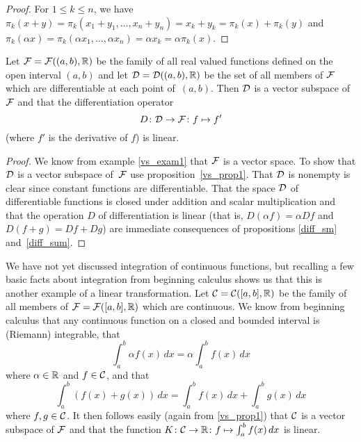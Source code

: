 \begin{proof} For $1 \le k \le n$, we have $\pi_k(x + y) = \pi_k(x_1 + y_1, \dots, x_n + y_n) =
x_k + y_k = \pi_k(x) + \pi_k(y)$ and $\pi_k(\alpha x) = \pi_k(\alpha x_1, \dots, \alpha x_n) =
\alpha x_k = \alpha \pi_k(x)$.
\end{proof}

\begin{exam}\label{lt_exam2}  Let $\mathcal{F} = \mathcal{F}((a,b),\mathbb{R})$ be the family of all real valued
functions defined on the open interval $(a,b)$ and let $\mathcal{D} = \mathcal{D}((a,b),\mathbb{R})$ be the set
of all members of $\mathcal{F}$ which are differentiable at each point of~$(a,b)$.  Then $\mathcal{D}$
is a vector subspace of $\mathcal{F}$ and that the differentiation operator
  \[ D \colon \mathcal{D} \rightarrow \mathcal{F} \colon  f \mapsto f' \]
(where $f'$ is the derivative of $f$) is linear.
\end{exam}

\begin{proof} We know from example \ref{vs_exam1} that $\mathcal{F}$ is a vector space.  To show that
$\mathcal{D}$ is a vector subspace of~$\mathcal{F}$ use proposition~\ref{vs_prop1}.  That $\mathcal{D}$ is
nonempty is clear since constant functions are differentiable. That the space $\mathcal{D}$ of
differentiable functions is closed under addition and scalar multiplication and that the
operation $D$ of differentiation is linear (that is, $D(\alpha f) = \alpha Df$ and $D(f + g) =
Df + Dg$) are immediate consequences of propositions \ref{diff_sm} and~\ref{diff_sum}.
\end{proof}

\begin{exam} We have not yet discussed integration of continuous functions, but recalling a few
basic facts about integration from beginning calculus shows us that this is another example of
a linear transformation.  Let $\mathcal{C} = \mathcal{C}([a,b],\mathbb{R})$ be the family of all members of
$\mathcal{F} = \mathcal{F}([a,b],\mathbb{R})$ which are continuous.  We know from beginning calculus that any
continuous function on a closed and bounded interval is (Riemann) integrable, that
 \[ \int_a^b \alpha f(x)\,dx = \alpha \int_a^b f(x)\,dx \]
where $\alpha \in \mathbb{R}$ and $f \in \mathcal{C}$, and that
 \[\int_a^b (f(x) + g(x))\,dx = \int_a^b f(x)\,dx + \int_a^b g(x)\,dx \]
where $f,g \in \mathcal{C}$.  It then follows easily (again from \ref{vs_prop1}) that $\mathcal{C}$ is a
vector subspace of $\mathcal{F}$ and that the function $K \colon \mathcal{C} \rightarrow \mathbb{R} \colon  f \mapsto
\int_a^b f(x)\,dx$ is linear.
\end{exam}



